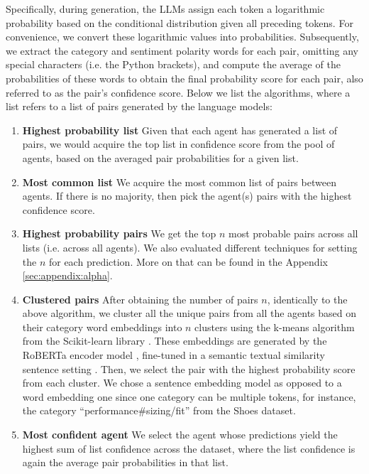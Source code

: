\documentclass[11pt]{article}
\begin{document}
Specifically, during generation, the LLMs assign each token a logarithmic probability based on the conditional distribution given all preceding tokens. For convenience, we convert these logarithmic values into probabilities. Subsequently, we extract the category and sentiment polarity words for each pair, omitting any special characters (i.e. the Python brackets), and compute the average of the probabilities of these words to obtain the final probability score for each pair, also referred to as the pair's confidence score. Below we list the algorithms, where a list refers to a list of pairs generated by the language models:
\begin{enumerate}
    \item \textbf{Highest probability list} Given that each agent has generated a list of pairs, we would acquire the top list in confidence score from the pool of agents, based on the averaged pair probabilities for a given list.
    
    
    \item \textbf{Most common list} We acquire the most common list of pairs between agents. If there is no majority, then pick the agent(s) pairs with the highest confidence score.
    
    \item \textbf{Highest probability pairs} We get the top $n$ most probable pairs across all lists (i.e. across all agents). We also evaluated different techniques for setting the $n$ for each prediction. More on that can be found in the Appendix \ref{sec:appendix:alpha}. 
    \item \textbf{Clustered pairs} After obtaining the number of pairs $n$, identically to the above algorithm, we cluster all the unique pairs from all the agents based on their category word embeddings into $n$ clusters using the k-means algorithm from the Scikit-learn library \citep{scikit-learn}. These embeddings are generated by the RoBERTa encoder model \citep{roberta}, fine-tuned in a semantic textual similarity sentence setting \citep{reimers-gurevych-2019-sentence}. Then, we select the pair with the highest probability score from each cluster. We chose a sentence embedding model as opposed to a word embedding one since one category can be multiple tokens, for instance, the category ``performance\#sizing/fit'' from the Shoes dataset.
    
    \item \textbf{Most confident agent} We select the agent whose predictions yield the highest sum of list confidence across the dataset, where the list confidence is again the average pair probabilities in that list.
\end{enumerate}
\end{document}
